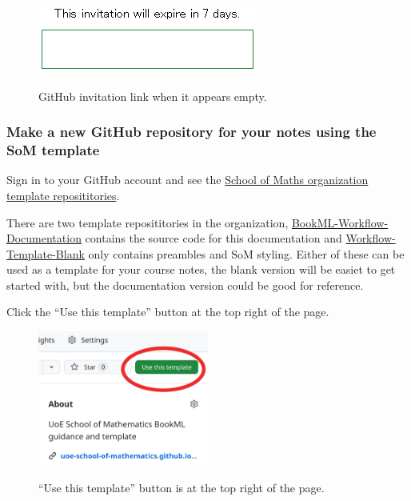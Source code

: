 \begin{figure}[h]
    \centering
    \includegraphics[alt={A blank rectangular box with the text ``This invitation will expire in 7 days'' written above.}]{img/GitHub-invitation.png}
    \caption{GitHub invitation link when it appears empty.}
    \label{fig:gh-invitation}
\end{figure}


\subsubsection{Make a new GitHub repository for your notes using the SoM template}

Sign in to your GitHub account and see the \href{https://github.com/orgs/UoE-School-of-Mathematics/repositories?q=template%3Atrue+archived%3Afalse}{School of Maths organization template reposititories}.

There are two template reposititories in the organization, \href{https://github.com/UoE-School-of-Mathematics/BookML-Workflow-Documentation}{BookML-Workflow-Documentation} contains the source code for this documentation and \href{https://github.com/UoE-School-of-Mathematics/Workflow-Template-Blank}{Workflow-Template-Blank} only contains preambles and SoM styling. Either of these can be used as a template for your course notes, the blank version will be easiet to get started with, but the documentation version could be good for reference.

Click the ``Use this template'' button at the top right of the page.

\begin{figure}[h]
    \centering
    \includegraphics[width=0.5\textwidth, alt={A screenshot of a webpage showing a green ``Use this template'' button circled in red.}]{img/use_template.png}
    \caption{``Use this template'' button is at the top right of the page.}
    \label{fig:use-template}
\end{figure}


